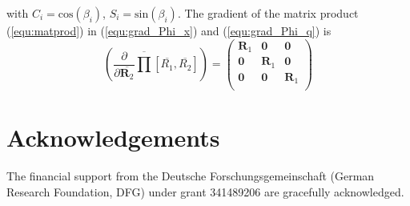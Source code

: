 \documentclass[twocolumn,10pt]{IFTOMM}
\newcommand{\bm}[1]{\boldsymbol{#1}}
\begin{document}
%
with $C_i=\mathrm{cos}(\beta_i)$, $S_i=\mathrm{sin}(\beta_i)$.
The gradient of the matrix product (\ref{equ:matprod}) in (\ref{equ:grad_Phi_x}) and (\ref{equ:grad_Phi_q}) is
\begin{equation}
\left(\frac{\partial }{\partial \overline{\bm{R}_2}}
\overline{\prod}\left[ \overline{R_1}, \overline{R_2}\right]\right)
=
\begin{pmatrix}
\bm{R}_1 & \bm{0} & \bm{0} \\
\bm{0} & \bm{R}_1 & \bm{0} \\
\bm{0} & \bm{0} & \bm{R}_1  \\
\end{pmatrix}
\end{equation}



\section{Acknowledgements}

The financial support from the Deutsche Forschungsgemeinschaft (German Research Foundation, DFG) under grant 341489206 are gracefully acknowledged.



\end{document}
